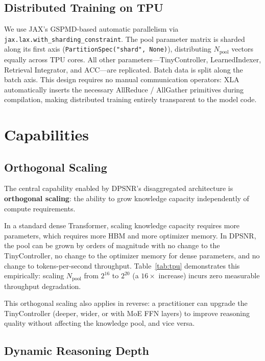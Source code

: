 \documentclass[11pt]{article}
\begin{document}
\subsection{Distributed Training on TPU}

We use JAX's GSPMD-based automatic parallelism via
\texttt{jax.lax.with\_sharding\_constraint}.
The pool parameter matrix is sharded along its first axis
(\texttt{PartitionSpec("shard", None)}), distributing $N_{\text{pool}}$
vectors equally across TPU cores.
All other parameters—TinyController, LearnedIndexer, Retrieval Integrator,
and ACC—are replicated.
Batch data is split along the batch axis.
This design requires no manual communication operators: XLA automatically
inserts the necessary AllReduce / AllGather primitives during compilation,
making distributed training entirely transparent to the model code.

\section{Capabilities}
\label{sec:capabilities}

\subsection{Orthogonal Scaling}
\label{sec:scaling}

The central capability enabled by DPSNR's disaggregated architecture is
\textbf{orthogonal scaling}: the ability to grow knowledge capacity independently
of compute requirements.

In a standard dense Transformer, scaling knowledge capacity requires more
parameters, which requires more HBM and more optimizer memory.
In DPSNR, the pool can be grown by orders of magnitude with no change to the
TinyController, no change to the optimizer memory for dense parameters, and
no change to tokens-per-second throughput.
Table~\ref{tab:tpu} demonstrates this empirically: scaling $N_{\text{pool}}$
from $2^{16}$ to $2^{20}$ (a $16\times$ increase) incurs zero measurable
throughput degradation.

This orthogonal scaling also applies in reverse: a practitioner can upgrade
the TinyController (deeper, wider, or with MoE FFN layers) to improve
reasoning quality without affecting the knowledge pool, and vice versa.

\subsection{Dynamic Reasoning Depth}
\label{sec:dynamic_compute}
\end{document}
